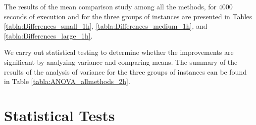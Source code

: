 The results of the mean comparison study among all the methods, for 4000 seconds of execution and for the three groups of instances are presented in Tables \ref{tabla:Differences_small_1h}, \ref{tabla:Differences_medium_1h}, and \ref{tabla:Differences_large_1h}.


We carry out statistical testing to determine whether the improvements are significant by analyzing variance and comparing means. The summary of the results of the analysis of variance for the three groups of instances can be found in Table \ref{tabla:ANOVA_allmethods_2h}.

\begin{table}[!htp]\centering
\caption{Analysis of variance summary for LB1, LB2, LB3, LB4, KS, MILP, SM2 under a running time limit of 7200 seconds.}\label{tabla:ANOVA_allmethods_2h}
\scriptsize
{}
\end{table}


\setcounter{table}{0}
\setcounter{figure}{0}
\renewcommand{\thetable}{C\arabic{table}}
\renewcommand{\thefigure}{C\arabic{figure}}
\section{Statistical Tests} \label{app:appC}

